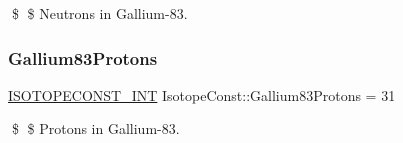\$ \$ Neutrons in Gallium-\/83. \mbox{\label{group___isotope_const-_gallium-_ga83_ga320ede1507cb8974cc3517ce604dbc89}} 
\subsubsection{\texorpdfstring{Gallium83\+Protons}{Gallium83Protons}}
{\footnotesize\ttfamily \mbox{\hyperlink{group___isotope_const-_macros_ga5f18360b3e99483a35c32d789e62621c}{I\+S\+O\+T\+O\+P\+E\+C\+O\+N\+S\+T\+\_\+\+I\+NT}} Isotope\+Const\+::\+Gallium83\+Protons = 31}

\$ \$ Protons in Gallium-\/83. 